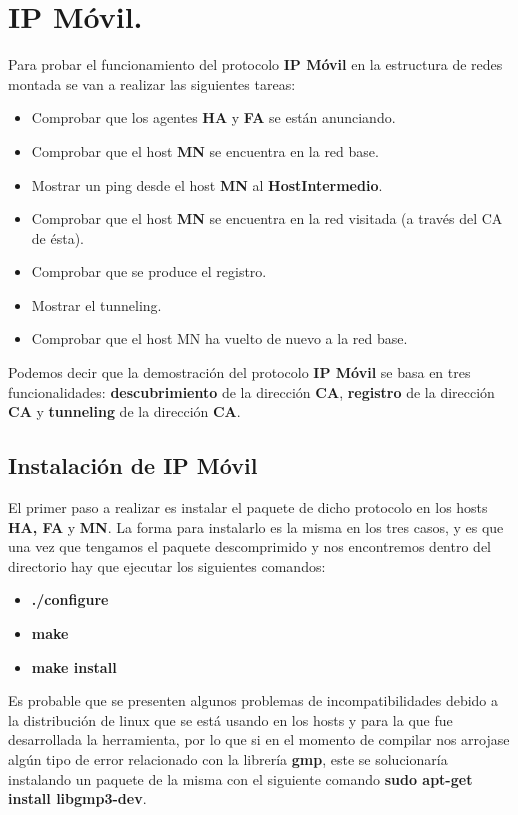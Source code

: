 \documentclass[10pt]{article}
\begin{document}
\section{IP Móvil.} 
Para probar el funcionamiento del protocolo \textbf{IP Móvil} en la estructura de redes montada se van a realizar las siguientes tareas:\\

\begin{itemize}
	\item Comprobar que los agentes \textbf{HA} y \textbf{FA} se están anunciando.
	\item Comprobar que el host \textbf{MN} se encuentra en la red base.
	\item Mostrar un ping desde el host \textbf{MN} al \textbf{HostIntermedio}.
	\item Comprobar que el host \textbf{MN} se encuentra en la red visitada (a través del CA de ésta).
	\item Comprobar que se produce el registro.
	\item Mostrar el tunneling.
	\item Comprobar que el host {MN} ha vuelto de nuevo a la red base.
\end{itemize}	

Podemos decir que la demostración del protocolo \textbf{IP Móvil} se basa en tres funcionalidades: \textbf{descubrimiento} de la dirección \textbf{CA}, \textbf{registro} de la dirección \textbf{CA} y \textbf{tunneling} de la dirección \textbf{CA}.

\subsection{Instalación de IP Móvil}
El primer paso a realizar es instalar el paquete de dicho protocolo en los hosts \textbf{HA, FA} y \textbf{MN}. La forma para instalarlo es la misma en los tres casos, y es que una vez que tengamos el paquete descomprimido y nos encontremos dentro del directorio hay que ejecutar los siguientes comandos:

\begin{itemize}
		\item \textbf{./configure}
		\item \textbf{make}
		\item \textbf{make install}
\end{itemize}	
 
 
Es probable que se presenten algunos problemas de incompatibilidades debido a la distribución de linux que se está usando en los hosts y para la que fue desarrollada la herramienta, por lo que si en el momento de compilar nos arrojase algún tipo de error relacionado con la librería \textbf{gmp}, este se solucionaría instalando un paquete de la misma con el siguiente comando \textbf{sudo apt-get install libgmp3-dev}. \\
\end{document}
